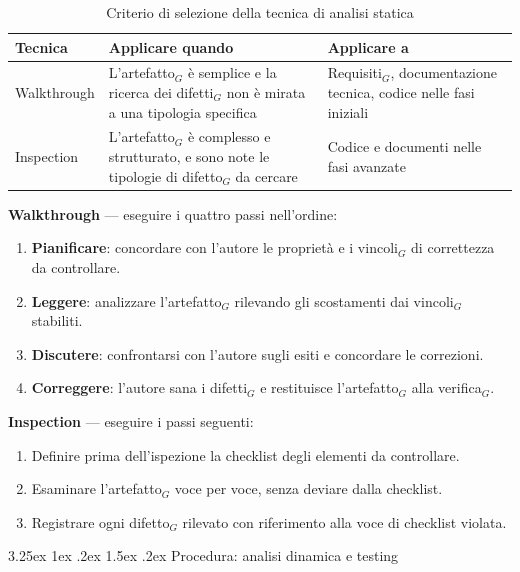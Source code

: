 \documentclass[a4paper, 10pt]{article}
\makeatletter
\renewcommand{\arraystretch}{1.2}
\renewcommand\paragraph{\@startsection{paragraph}{4}{\z@}%
  {3.25ex \@plus1ex \@minus .2ex}%
  {1.5ex \@plus .2ex}%
  {\normalfont\normalsize\bfseries}}
\makeatother
\begin{document}
\begin{table}[H]
    \centering
    \renewcommand{\arraystretch}{1.3}
    \begin{tabularx}{\textwidth}{|l|L|L|}
        \hline
        \textbf{Tecnica} & \textbf{Applicare quando} & \textbf{Applicare a} \\
        \hline
        Walkthrough & L'artefatto$_G$ è semplice e la ricerca dei difetti$_G$ non è mirata a una tipologia specifica & Requisiti$_G$, documentazione tecnica, codice nelle fasi iniziali \\ \hline
        Inspection & L'artefatto$_G$ è complesso e strutturato, e sono note le tipologie di difetto$_G$ da cercare & Codice e documenti nelle fasi avanzate \\ \hline
    \end{tabularx}
    \caption{Criterio di selezione della tecnica di analisi statica}
\end{table}

\noindent \textbf{Walkthrough} --- eseguire i quattro passi nell'ordine:
\begin{enumerate}
    \item \textbf{Pianificare}: concordare con l'autore le proprietà e i vincoli$_G$ di correttezza da controllare.
    \item \textbf{Leggere}: analizzare l'artefatto$_G$ rilevando gli scostamenti dai vincoli$_G$ stabiliti.
    \item \textbf{Discutere}: confrontarsi con l'autore sugli esiti e concordare le correzioni.
    \item \textbf{Correggere}: l'autore sana i difetti$_G$ e restituisce l'artefatto$_G$ alla verifica$_G$.
\end{enumerate}

\noindent \textbf{Inspection} --- eseguire i passi seguenti:
\begin{enumerate}
    \item Definire prima dell'ispezione la checklist degli elementi da controllare.
    \item Esaminare l'artefatto$_G$ voce per voce, senza deviare dalla checklist.
    \item Registrare ogni difetto$_G$ rilevato con riferimento alla voce di checklist violata.
\end{enumerate}

\paragraph{Procedura: analisi dinamica e testing}
\end{document}
